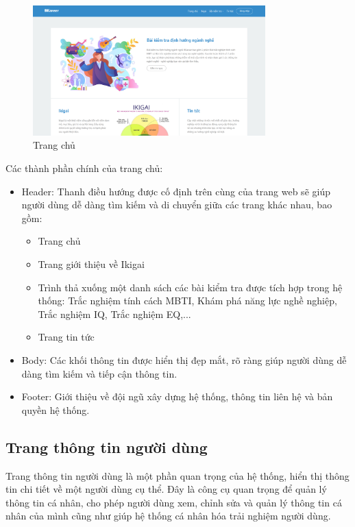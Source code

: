\begin{figure}[H]
    \centering
    \includegraphics[width=0.8\textwidth]
    {images/chap5/homeScreen.png}
    \vspace{0.5cm}
    \caption{Trang chủ}
\end{figure}

Các thành phần chính của trang chủ:
\begin{itemize}
    \item Header: Thanh điều hướng được cố định trên cùng của trang web sẽ giúp người dùng dễ dàng tìm kiếm và di chuyển giữa các trang khác nhau, bao gồm:
        \begin{itemize}
            \item Trang chủ
            \item Trang giới thiệu về Ikigai
            \item Trình thả xuống một danh sách các bài kiểm tra được tích hợp trong hệ thống: Trắc nghiệm tính cách MBTI, Khám phá năng lực nghề nghiệp, Trắc nghiệm IQ, Trắc nghiệm EQ,...
            \item Trang tin tức
        \end{itemize}
    \item Body: Các khối thông tin được hiển thị đẹp mắt, rõ ràng giúp người dùng dễ dàng tìm kiếm và tiếp cận thông tin.
    \item Footer: Giới thiệu về đội ngũ xây dựng hệ thống, thông tin liên hệ và bản quyền hệ thống.
\end{itemize}


\subsection{Trang thông tin người dùng}
Trang thông tin người dùng là một phần quan trọng của hệ thống, hiển thị thông tin chi tiết về một người dùng cụ thể. Đây là công cụ quan trọng để quản lý thông tin cá nhân, cho phép người dùng xem, chỉnh sửa và quản lý thông tin cá nhân của mình cũng như giúp hệ thống cá nhân hóa trải nghiệm người dùng.

